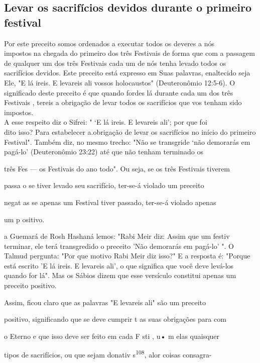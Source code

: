 \begin{itemize}
\begin{enumrate}
\begin{itemize}
\begin{itemize}
\section{Levar os sacrifícios devidos durante o primeiro festival}


Por este preceito somos ordenados a executar todos os deveres a nós\\
impostos na chegada do primeiro dos três Festivais de forma que com a
passagem
de qualquer um dos três Festivais cada um de nós tenha levado todos
os\\
sacrifícios devidos. Este preceito está expresso em Suas palavras,
enaltecido seja\\
Ele, "E lá ireis. E levareis ali vossos holocaustos" (Deuteronômio
12:5-6). O significado
deste preceito é que quando fordes lá durante cada um dos três
Festivais
, tereis a obrigação de levar todos os sacrifícios que vos tenham
sido impostos.\\
A esse respeito diz o Sifrei: " `E lá ireis. E levareis ali'; por que
foi\\
dito isso? Para estabelecer a.obrigação de levar os sacrifícios no
início do primeiro
Festival". Também diz, no mesmo trecho: "Não se transgride `não
demorarás
em pagá-lo' (Deuteronômio 23:22) até que não tenham terminado os


três Fes --- os Festivais do ano todo". Ou seja, se os três Festivais
tiverem

passa o se tiver levado seu sacrifício, ter-se-á violado um preceito

negat as se apenas um Festival tiver passado, ter-se-á violado apenas

um p ositivo.

a Guemará de Rosh Hashaná lemos: "Rabi Meir diz: Assim que um festiv
terminar, ele terá transgredido o preceito 'Não demorarás em pagá-lo' ".
O Talmud pergunta: "Por que motivo Rabi Meir diz isso?" E a resposta é:
"Por­que está escrito 'E lá ireis. E levareis ali', o que significa que
você deve levá-los quando for lá". Mas os Sábios dizem que esse
versículo constitui apenas um preceito positivo.


Assim, ficou claro que as palavras "E levareis ali" são um preceito


positivo, significando que se deve cumprir t as suas obrigações para com

o Eterno e que isso deve ser feito em cada F sti , u• m elas quaisquer

tipos de sacrifícios, ou que sejam donativ s\textsuperscript{108}, alor
coisas consagra-



\end{itemize}
\end{itemize}
\end{enumrate}
\end{itemize}
